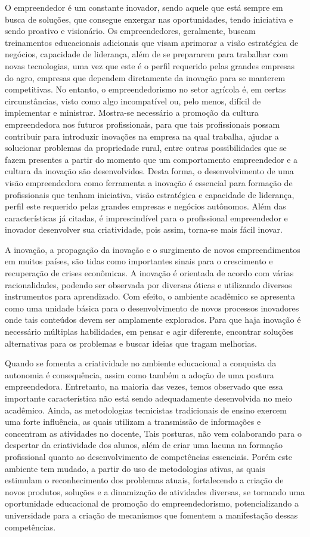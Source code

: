 O empreendedor é um constante inovador, sendo aquele que está sempre em busca de soluções, que consegue enxergar nas oportunidades, tendo iniciativa e sendo proativo e visionário. Os empreendedores, geralmente, buscam treinamentos educacionais adicionais que visam aprimorar a visão estratégica de negócios, capacidade de liderança, além de se prepararem para trabalhar com novas tecnologias, uma vez que este é o perfil requerido pelas grandes empresas do agro, empresas que dependem diretamente da inovação para se manterem competitivas. No entanto, o empreendedorismo no setor agrícola é, em certas circunstâncias, visto como algo incompatível ou, pelo menos, difícil de implementar e ministrar. Mostra-se necessário a promoção da cultura empreendedora nos futuros profissionais, para que tais profissionais possam contribuir para introduzir inovações na empresa na qual trabalha, ajudar a solucionar problemas da propriedade rural, entre outras possibilidades que se fazem presentes a partir do momento que um comportamento empreendedor e a cultura da inovação são desenvolvidos. Desta forma, o desenvolvimento de uma visão empreendedora como ferramenta a inovação é essencial para formação de profissionais que tenham iniciativa, visão estratégica e capacidade de liderança, perfil este requerido pelas grandes empresas e negócios autônomos. Além das características já citadas, é imprescindível para o profissional empreendedor e inovador desenvolver sua criatividade, pois assim, torna-se mais fácil inovar. 


A inovação, a propagação da inovação e o surgimento de novos empreendimentos em muitos países, são tidas como importantes sinais para o crescimento e recuperação de crises econômicas. A inovação é orientada de acordo com várias racionalidades, podendo ser observada por diversas óticas e utilizando diversos instrumentos para aprendizado. Com efeito, o ambiente acadêmico se apresenta como uma unidade básica para o desenvolvimento de novos processos inovadores onde tais conteúdos devem ser amplamente explorados. Para que haja inovação é necessário múltiplas habilidades, em pensar e agir diferente, encontrar soluções alternativas para os problemas e buscar ideias que tragam melhorias. 

Quando se fomenta a criatividade no ambiente educacional a conquista da autonomia é consequência, assim como também a adoção de uma postura empreendedora. Entretanto, na maioria das vezes, temos observado que essa importante característica não está sendo adequadamente desenvolvida no meio acadêmico. Ainda, as metodologias tecnicistas tradicionais de ensino exercem uma forte influência, as quais utilizam a transmissão de informações e concentram as atividades no docente, Tais posturas, não vem colaborando para o despertar da criatividade dos alunos, além de criar uma lacuna na formação profissional quanto ao desenvolvimento de competências essenciais. Porém este ambiente tem mudado, a partir do uso de metodologias ativas, as quais estimulam o reconhecimento dos problemas atuais, fortalecendo a criação de novos produtos, soluções e a dinamização de atividades diversas, se tornando uma oportunidade educacional de promoção do empreendedorismo, potencializando a universidade para a criação de mecanismos que fomentem a manifestação dessas competências.

